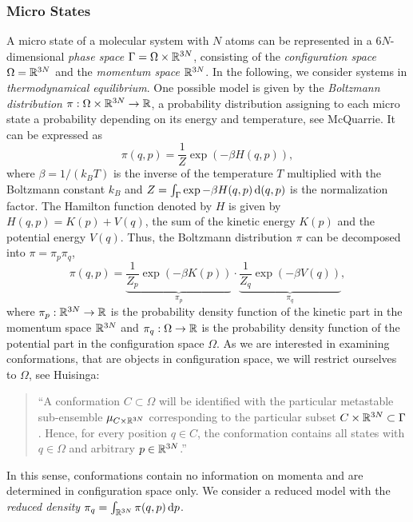 \subsubsection*{Micro States}
A micro state of a molecular system with $N$ atoms can be represented in a $6N$-dimensional \textit{phase space} $\Gamma = \Omega \times {\mathbb{R}^{3N}}$, consisting of the \textit{configuration space} $\Omega = {\mathbb{R}^{3N}}$ and the \textit{momentum space} ${\mathbb{R}^{3N}}$. In the following, we consider systems in \textit{thermodynamical equilibrium}.
One possible model is given by the \textit{Boltzmann distribution} $\pi: \Omega \times \mathbb{R}^{3N} \rightarrow \mathbb{R}$, a
probability distribution assigning to each micro state a probability depending on its energy and temperature,
see McQuarrie\cite{mcquarrie2000}. It can be expressed as
\begin{equation}
\pi(q,p) = \frac{1}{Z} \exp{(-\beta H(q,p))},
\end{equation}
where $\beta = 1/ (k_BT)$ is the inverse of the temperature $T$ multiplied with the Boltzmann constant $k_B$
and $Z= \int_\Gamma \exp{-\beta H(q,p)} \mathop{}\!\mathrm{d}(q,p)$ is the normalization factor. The Hamilton function denoted by $H$ is given by $H(q,p) = K(p)+V(q)$, the sum of the kinetic energy $K(p)$ and the potential energy $V(q)$.
Thus, the Boltzmann distribution $\pi$ can be decomposed into $\pi = \pi_p \pi_q$,
\begin{equation*}
\pi(q,p) =  \underbrace{\frac{1}{Z_p} \exp{(-\beta K(p))}}_{\pi_p} \cdot
\underbrace{\frac{1}{Z_q} \exp{(-\beta V(q))}}_{\pi_q},
\end{equation*}
where $\pi_p: \mathbb{R}^{3N}  \rightarrow \mathbb{R}$ is the probability density function of the kinetic part in the momentum space $\mathbb{R}^{3N}$ and $\pi_q: \Omega \rightarrow \mathbb{R}$ is the probability density function of the potential part in the configuration space $\Omega$.
As we are interested in examining conformations, that are objects in configuration space, we will restrict ourselves to $\Omega$, see Huisinga\cite{huisinga2001metastability}:
\begin{quote}
``A conformation $C \subset \Omega$ will be identified with the particular metastable sub-ensemble $\mu_{C \times \mathbb{R}^{3N}}$ corresponding to the particular subset $C \times \mathbb{R}^{3N} \subset \Gamma$. Hence, for every position $q \in C$, the conformation contains all states with $q \in \Omega$ and arbitrary $p \in \mathbb{R}^{3N}$.''
\end{quote}
In this sense, conformations contain no information on momenta and are determined in configuration space only. We consider a reduced model with the \textit{reduced density} $\pi_q = \int_{\mathbb{R}^{3N}} \pi(q,p) \mathop{}\!\mathrm{d} p$.

